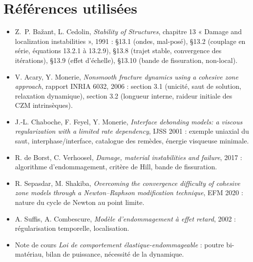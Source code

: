 \documentclass[11pt,a4paper]{article}
\begin{document}
\section*{Références utilisées}
\begin{itemize}[nosep]
  \item Z.~P. Bažant, L. Cedolin, \emph{Stability of Structures}, chapitre 13 « Damage and
        localization instabilities », 1991 : §13.1 (ondes, mal-posé), §13.2 (couplage en série,
        équations 13.2.1 à 13.2.9), §13.8 (trajet stable, convergence des itérations), §13.9
        (effet d'échelle), §13.10 (bande de fissuration, non-local).
  \item V. Acary, Y. Monerie, \emph{Nonsmooth fracture dynamics using a cohesive zone approach},
        rapport INRIA 6032, 2006 : section 3.1 (unicité, saut de solution, relaxation
        dynamique), section 3.2 (longueur interne, raideur initiale des CZM intrinsèques).
  \item J.-L. Chaboche, F. Feyel, Y. Monerie, \emph{Interface debonding models: a viscous
        regularization with a limited rate dependency}, IJSS 2001 : exemple uniaxial du saut,
        interphase/interface, catalogue des remèdes, énergie visqueuse minimale.
  \item R. de Borst, C. Verhoosel, \emph{Damage, material instabilities and failure}, 2017 :
        algorithme d'endommagement, critère de Hill, bande de fissuration.
  \item R. Sepasdar, M. Shakiba, \emph{Overcoming the convergence difficulty of cohesive zone
        models through a Newton--Raphson modification technique}, EFM 2020 : nature du cycle de
        Newton au point limite.
  \item A. Suffis, A. Combescure, \emph{Modèle d'endommagement à effet retard}, 2002 :
        régularisation temporelle, localisation.
  \item Note de cours \emph{Loi de comportement élastique-endommageable} : poutre
        bi-matériau, bilan de puissance, nécessité de la dynamique.
\end{itemize}
\end{document}
